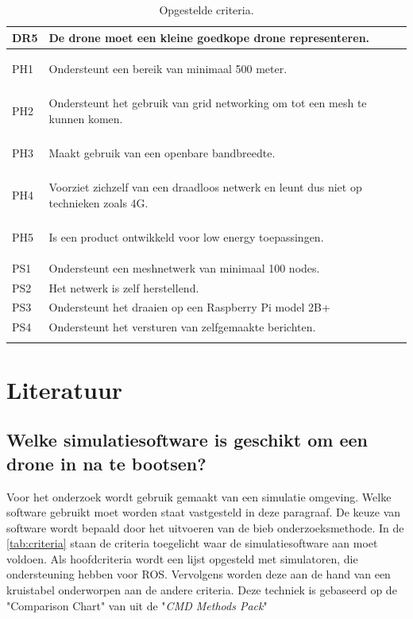 \documentclass[a4paper, 11pt, oneside]{report}
\begin{document}
\begin{longtable}{|l|l|l|}
		DR5		& De drone moet een kleine goedkope drone representeren.        \\ \hline
		\hypertarget{ph1}{PH1}		& Ondersteunt een bereik van minimaal 500 meter.  \\ \hline
		\hypertarget{ph2}{PH2}		& Ondersteunt het gebruik van grid networking om tot een mesh te kunnen komen.  \\ \hline
		\hypertarget{ph3}{PH3}		& Maakt gebruik van een openbare bandbreedte.\\ \hline
		\hypertarget{ph4}{PH4}		& Voorziet zichzelf van een draadloos netwerk en leunt dus niet op technieken zoals 4G.\\ \hline
		\hypertarget{ph5}{PH5}		& Is een product ontwikkeld voor low energy toepassingen. \\ \hline
		PS1		& Ondersteunt een meshnetwerk van minimaal 100 nodes. \\ \hline
		PS2		& Het netwerk is zelf herstellend. \\ \hline
		PS3		& Ondersteunt het draaien op een Raspberry Pi model 2B+ \\ \hline
		PS4		& Ondersteunt het versturen van zelfgemaakte berichten. \\ \hline
		
	\caption{Opgestelde criteria.}
	\label{tab:criteria}
\end{longtable}

\chapter{Literatuur}


\section[Welke simulatiesoftware?]{Welke simulatiesoftware is geschikt om een drone in na te bootsen?}
\label{sec:welkesim}
Voor het onderzoek wordt gebruik gemaakt van een simulatie omgeving.
Welke software gebruikt moet worden staat vastgesteld in deze paragraaf.
De keuze van software wordt bepaald door het uitvoeren van de bieb onderzoeksmethode. 
In de \autoref{tab:criteria} staan de criteria toegelicht waar de simulatiesoftware aan moet voldoen.
Als hoofdcriteria wordt een lijst opgesteld met simulatoren, die ondersteuning hebben voor ROS.
Vervolgens worden deze aan de hand van een kruistabel onderworpen aan de andere criteria.
Deze techniek is gebaseerd op de "Comparison Chart" van \cite{CMDmethod} uit de "\textit{CMD Methods Pack}"
\end{document}
